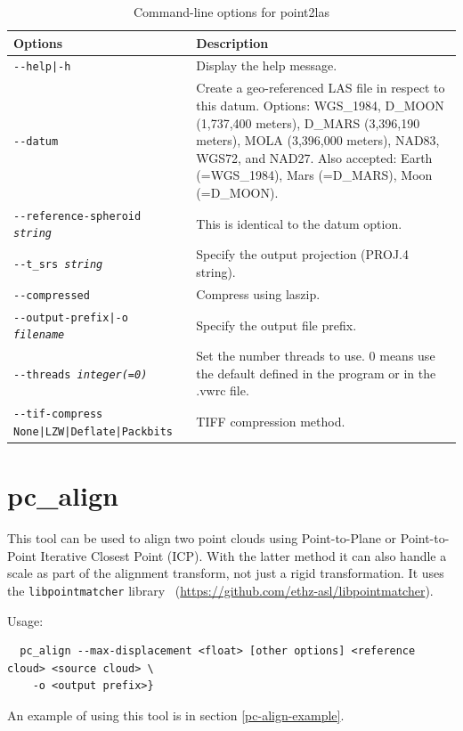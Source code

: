 \begin{longtable}{|l|p{10cm}|}
\caption{Command-line options for point2las}
\label{tbl:point2las}
\endfirsthead
\endhead
\endfoot
\endlastfoot
\hline
Options & Description \\ \hline \hline
\texttt{-\/-help|-h} & Display the help message.\\ \hline
\texttt{-\/-datum} & Create a geo-referenced LAS file in respect to this datum. Options: WGS\_1984, D\_MOON (1,737,400 meters), D\_MARS (3,396,190 meters), MOLA (3,396,000 meters), NAD83, WGS72, and NAD27. Also accepted: Earth (=WGS\_1984), Mars (=D\_MARS), Moon (=D\_MOON). \\ \hline
\texttt{-\/-reference-spheroid \textit{string}} & This is identical to the datum option. \\ \hline
\texttt{-\/-t\_srs \textit{string}} & Specify the output projection (PROJ.4 string). \\ \hline
\texttt{-\/-compressed} &
Compress using laszip. \\ \hline
\texttt{-\/-output-prefix|-o \textit{filename}} & Specify the output file prefix. \\ \hline
\texttt{-\/-threads \textit{integer(=0)}} & Set the number threads to use. 0 means use the default defined in the program or in the .vwrc file.\\ \hline
\texttt{-\/-tif-compress None|LZW|Deflate|Packbits} & TIFF compression method.\\ \hline
\end{longtable}

\section{pc\_align}
\label{pcalign}

This tool can be used to align two point clouds using Point-to-Plane or
Point-to-Point Iterative Closest Point (ICP). With the latter method it
can also handle a scale as part of the alignment transform, not just a
rigid transformation. It uses the \texttt{libpointmatcher}
library~\cite{Pomerleau12comp}
(\url{https://github.com/ethz-asl/libpointmatcher}).

\medskip
Usage:
\begin{verbatim}
  pc_align --max-displacement <float> [other options] <reference cloud> <source cloud> \
    -o <output prefix>}
\end{verbatim}

An example of using this tool is in section \ref{pc-align-example}.


